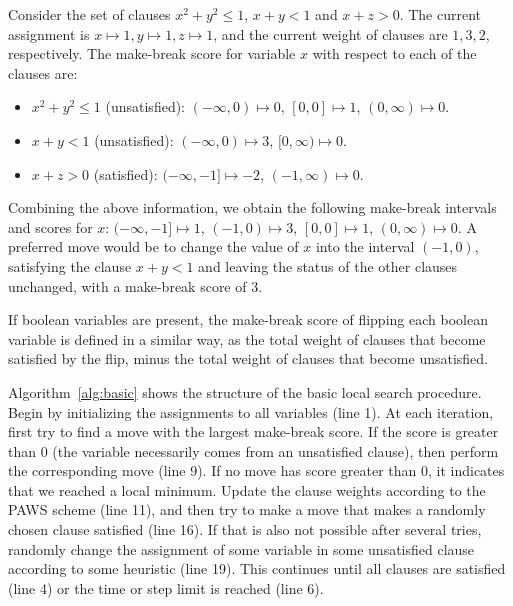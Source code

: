 \documentclass[runningheads]{llncs}
\begin{document}
\begin{example}
\label{ex:make-break}
Consider the set of clauses $x^2+y^2\le 1$, $x+y<1$ and $x+z>0$. The current assignment is $x\mapsto 1, y\mapsto 1, z\mapsto 1$, and the current weight of clauses are $1,3,2$, respectively. The make-break score for variable $x$ with respect to each of the clauses are:
\begin{itemize}
    \item $x^2+y^2\le 1$ (unsatisfied): $(-\infty,0)\mapsto 0$, $[0,0]\mapsto 1$, $(0,\infty)\mapsto 0$.
    \item $x+y<1$ (unsatisfied): $(-\infty,0)\mapsto 3$, $[0,\infty)\mapsto 0$.
    \item $x+z>0$ (satisfied): $(-\infty,-1]\mapsto -2$, $(-1,\infty)\mapsto 0$.
\end{itemize}
Combining the above information, we obtain the following make-break intervals and scores for $x$: $(-\infty,-1]\mapsto 1$, $(-1,0)\mapsto 3$, $[0,0]\mapsto 1$, $(0,\infty)\mapsto 0$. A preferred move would be to change the value of $x$ into the interval $(-1,0)$, satisfying the clause $x+y<1$ and leaving the status of the other clauses unchanged, with a make-break score of 3.
\end{example}

If boolean variables are present, the make-break score of flipping each boolean variable is defined in a similar way, as the total weight of clauses that become satisfied by the flip, minus the total weight of clauses that become unsatisfied.

Algorithm~\ref{alg:basic} shows the structure of the basic local search procedure. Begin by initializing the assignments to all variables (line 1). At each iteration, first try to find a move with the largest make-break score. If the score is greater than 0 (the variable necessarily comes from an unsatisfied clause), then perform the corresponding move (line 9). If no move has score greater than 0, it indicates that we reached a local minimum. Update the clause weights according to the PAWS scheme (line 11), and then try to make a move that makes a randomly chosen clause satisfied (line 16). If that is also not possible after several tries, randomly change the assignment of some variable in some unsatisfied clause according to some heuristic (line 19). This continues until all clauses are satisfied (line 4) or the time or step limit is reached (line 6).
\end{document}
